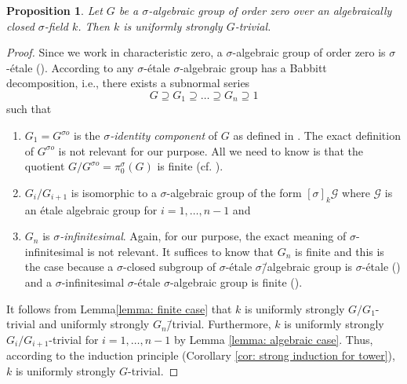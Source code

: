 \documentclass[oneside,reqno]{amsart}
\newtheorem{prop}[theo]{Proposition}
\theoremstyle{definition}
\newcommand{\G}{\mathcal{G}}
\newcommand{\s}{\sigma}
\newcommand{\pis}{\pi_0^\sigma}
\renewcommand{\sc}{{\sigma o}}
\begin{document}
\begin{prop} \label{prop: order zero}
Let $G$ be a $\s$-algebraic group of order zero over an algebraically closed $\s$-field $k$. 
Then $k$ is uniformly strongly $G$-trivial. 
\end{prop}
\begin{proof}

Since we work in characteristic zero, a $\s$-algebraic group of order zero is $\s$-\'{e}tale (\cite[Cor. 4.9]{Wibmer:etale}). According to \cite[Theorem 6.38]{Wibmer:etale} any $\s$-\'{e}tale $\s$-algebraic group has a Babbitt decomposition, i.e., there exists a subnormal series
	$$G\supseteq G_1\supseteq\ldots\supseteq G_n\supseteq 1$$
	such that
	\begin{enumerate}
		\item $G_1=G^\sc$ is the \emph{$\s$-identity component} of $G$ as defined in \cite[Def. 3.16]{Wibmer:etale}. The exact definition of 
		$G^\sc$ is not relevant for our purpose. All we need to know is that the quotient $G/G^\sc=\pis(G)$ is finite (cf. \cite[Prop. 3.13]{Wibmer:etale}).		
		\item $G_i/G_{i+1}$ is isomorphic to a $\s$-algebraic group of the form $[\s]_k\G$ where $\G$ is an \'{e}tale algebraic group for $i=1,\dots,n-1$ and
		\item $G_n$ is \emph{$\s$-infinitesimal}. Again, for our purpose, the exact meaning of $\s$-infinitesimal is not relevant. It suffices to know that $G_n$ is finite and this is the case because a $\s$-closed subgroup of $\s$-\'{e}tale $\s$\=/algebraic group is $\s$-\'{e}tale (\cite[Lemma 4.6]{Wibmer:etale}) and a $\s$-infinitesimal $\s$-\'{e}tale $\s$-algebraic group is finite (\cite[Cor. 6.6]{Wibmer:etale}).
%		
	\end{enumerate}
It follows from Lemma\ref{lemma: finite case} that $k$ is uniformly strongly $G/G_1$-trivial and uniformly strongly $G_n$\=/trivial.
Furthermore, $k$ is uniformly strongly $G_i/G_{i+1}$-trivial for $i=1,\ldots,n-1$ by Lemma \ref{lemma: algebraic case}. Thus, according to the induction principle (Corollary \ref{cor: strong induction for tower}), $k$ is uniformly strongly $G$-trivial. 	
\end{proof}
\end{document}
